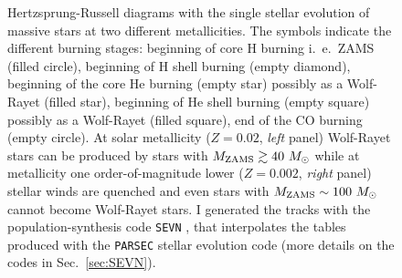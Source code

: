 \documentclass[a4paper,titlepage]{book}     	%
\newcommand{\sun}{\ensuremath{_\odot}}
\newcommand{\mzams}{M_\textup{ZAMS}}
\newcommand{\msun}{\ensuremath{M\sun}}
\begin{document}
\begin{figure}[h!]
\begin{minipage}{.49\textwidth}
	\end{minipage}
	\caption{Hertzsprung-Russell diagrams with the single stellar evolution of massive stars at two different metallicities. The symbols indicate the different burning stages: beginning of core H burning i.\ e.\ ZAMS (filled circle), beginning of H shell burning (empty diamond), beginning of the core He burning (empty star) possibly as a Wolf-Rayet (filled star), beginning of He shell burning (empty square) possibly as a Wolf-Rayet (filled square), end of the CO burning (empty circle). At solar metallicity ($Z=0.02$, \emph{left} panel) Wolf-Rayet stars can be produced by stars with $\mzams \gtrsim 40~\msun$ while at metallicity one order-of-magnitude lower ($Z=0.002$, \emph{right} panel) stellar winds are quenched and even stars with $\mzams \sim 100~\msun$ cannot become Wolf-Rayet stars. I generated the tracks with the population-synthesis code \texttt{SEVN} \cite{spera2019_mergingBBH}, that interpolates the tables produced with the \texttt{PARSEC} stellar evolution code \cite{parsec2015_chen} (more details on the codes in Sec.\ \ref{sec:SEVN}).}\label{fig:HRdiagrams}
\end{figure}
\end{document}
